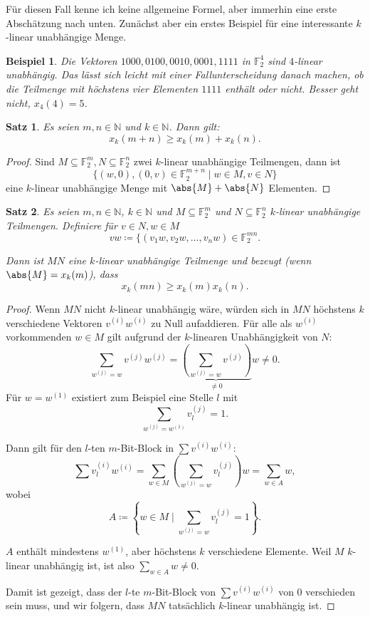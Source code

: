 \documentclass[a4paper]{scrartcl}
\theoremstyle{break}
\newtheorem{theorem}{Satz}
\newtheorem{example}{Beispiel}
\newcommand{\N}{\mathbb{N}}
\newcommand{\F}{\mathbb{F}}
\begin{document}
Für diesen Fall kenne ich keine allgemeine Formel, aber immerhin eine erste Abschätzung nach unten. Zunächst aber ein erstes Beispiel
für eine interessante $k$-linear unabhängige Menge.

\begin{example}
  Die Vektoren $1000, 0100, 0010, 0001, 1111$ in $\F_2^4$ sind $4$-linear unabhängig. Das lässt sich leicht mit einer Fallunterscheidung
  danach machen, ob die Teilmenge mit höchstens vier Elementen $1111$ enthält oder nicht. Besser geht nicht, $x_4(4) = 5$.
\end{example}

\begin{theorem}
  Es seien $m, n \in \N$ und $k \in \N$. Dann gilt:
  \[
    x_k(m + n) \ge x_k(m) + x_k(n)
  .\]
\end{theorem}
\begin{proof}
  Sind $M \subseteq \F_2^m, N \subseteq \F_2^n$ zwei $k$-linear unabhängige Teilmengen, dann ist
  \[
    \{ (w, 0), (0, v) \in \F_2^{m+n} \mid w \in M, v \in N \}
  \]
  eine $k$-linear unabhängige Menge mit $\abs{M} + \abs{N}$ Elementen.
\end{proof}

\begin{theorem}
  Es seien $m, n \in \N$, $k \in \N$ und $M \subseteq \F_2^m$ und $N \subseteq \F_2^n$ $k$-linear unabhängige Teilmengen.
  Definiere für $v\in N, w \in M$
  \[
    vw \coloneqq \{ (v_1 w, v_2 w, \ldots, v_n w) \in \F_2^{mn}
  .\]
  
  Dann ist $MN$ eine $k$-linear unabhängige Teilmenge und bezeugt (wenn $\abs{M} = x_k(m)$), dass
  \[
    x_k(mn) \ge x_k(m) x_k(n)
  .\]
\end{theorem}
\begin{proof}
  Wenn $MN$ nicht $k$-linear unabhängig wäre, würden sich in $MN$ höchstens $k$ verschiedene Vektoren $v^{(i)}w^{(i)}$ zu Null aufaddieren.
  Für alle als $w^{(i)}$ vorkommenden $w \in M$ gilt aufgrund der $k$-linearen Unabhängigkeit von $N$:
  \[
    \sum_{w^{(j)}=w} v^{(j)}w^{(j)} = \underbrace{\left(\sum_{w^{(j)} = w} v^{(j)}\right)}_{\ne 0}w \ne 0
  .\]
  Für $w = w^{(1)}$ existiert zum Beispiel eine Stelle $l$ mit
  \[
    \sum_{w^{(j)} = w^{(1)}} v^{(j)}_l = 1
  .\]
  
  Dann gilt für den $l$-ten $m$-Bit-Block in $\sum v^{(i)} w^{(i)}$:
  \[
    \sum v^{(i)}_l w^{(i)} = \sum_{w \in M} \left(\sum_{w^{(j)} = w} v^{(j)}_l\right)w = \sum_{w\in A} w
  ,\]
  wobei
  \[
    A \coloneqq \left\{ w\in M \mid \sum_{w^{(j)} = w} v^{(j)}_l = 1 \right\}
  .\]
  
  $A$ enthält mindestens $w^{(1)}$, aber höchstens $k$ verschiedene Elemente.
  Weil $M$ $k$-linear unabhängig ist, ist also $\sum_{w\in A} w \ne 0$.

  Damit ist gezeigt, dass der $l$-te $m$-Bit-Block von $\sum v^{(i)} w^{(i)}$ von $0$ verschieden sein muss,
  und wir folgern, dass $MN$ tatsächlich $k$-linear unabhängig ist.
\end{proof}
\end{document}

